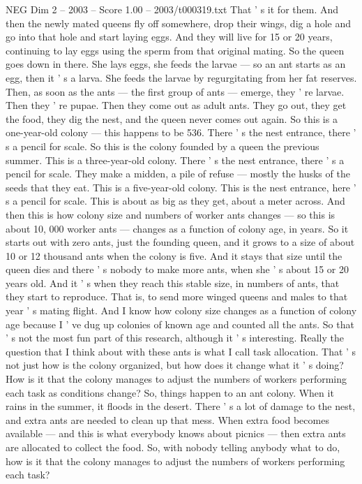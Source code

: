 \begin{textsample}{NEG Dim 2 – 2003 – Score 1.00 – 2003/t000319.txt}
That ' s it for them.
And then the newly mated queens fly off somewhere, drop their wings, dig a hole and go into that hole and start laying eggs.
And they will live for 15 or 20 years, continuing to lay eggs using the sperm from that original mating.
So the queen goes down in there.
She lays eggs, she feeds the larvae — so an ant starts as an egg, then it ' s a larva.
She feeds the larvae by regurgitating from her fat reserves.
Then, as soon as the ants — the first group of ants — emerge, they ' re larvae.
Then they ' re pupae.
Then they come out as adult ants.
They go out, they get the food, they dig the nest, and the queen never comes out again.
So this is a one-year-old colony — this happens to be 536.
There ' s the nest entrance, there ' s a pencil for scale.
So this is the colony founded by a queen the previous summer.
This is a three-year-old colony.
There ' s the nest entrance, there ' s a pencil for scale.
They make a midden, a pile of refuse — mostly the husks of the seeds that they eat.
This is a five-year-old colony.
This is the nest entrance, here ' s a pencil for scale.
This is about as big as they get, about a meter across.
And then this is how colony size and numbers of worker ants changes — so this is about 10, 000 worker ants — changes as a function of colony age, in years.
So it starts out with zero ants, just the founding queen, and it grows to a size of about 10 or 12 thousand ants when the colony is five.
And it stays that size until the queen dies and there ' s nobody to make more ants, when she ' s about 15 or 20 years old.
And it ' s when they reach this stable size, in numbers of ants, that they start to reproduce.
That is, to send more winged queens and males to that year ' s mating flight.
And I know how colony size changes as a function of colony age because I ' ve dug up colonies of known age and counted all the ants.
So that ' s not the most fun part of this research, although it ' s interesting.
Really the question that I think about with these ants is what I call task allocation.
That ' s not just how is the colony organized, but how does it change what it ' s doing?
How is it that the colony manages to adjust the numbers of workers performing each task as conditions change?
So, things happen to an ant colony.
When it rains in the summer, it floods in the desert.
There ' s a lot of damage to the nest, and extra ants are needed to clean up that mess.
When extra food becomes available — and this is what everybody knows about picnics — then extra ants are allocated to collect the food.
So, with nobody telling anybody what to do, how is it that the colony manages to adjust the numbers of workers performing each task?

\end{textsample}
